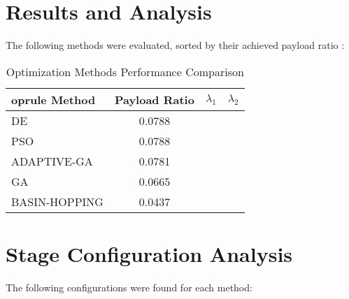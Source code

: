 \documentclass[11pt]{article}
\begin{document}
\section{Results and Analysis}
The following methods were evaluated, sorted by their achieved payload ratio \cite{pso_ascent_2013}:

\begin{table}[H]
\centering
\caption{Optimization Methods Performance Comparison}
\begin{tabular}{lccc}
	oprule
Method & Payload Ratio & $\lambda_{1}$ & $\lambda_{2}$ \\
\midrule
DE & 0.0788 \\
PSO & 0.0788 \\
ADAPTIVE-GA & 0.0781 \\
GA & 0.0665 \\
BASIN-HOPPING & 0.0437 \\
\bottomrule
\end{tabular}
\end{table}

\section{Stage Configuration Analysis}
The following configurations were found for each method:
\end{document}
